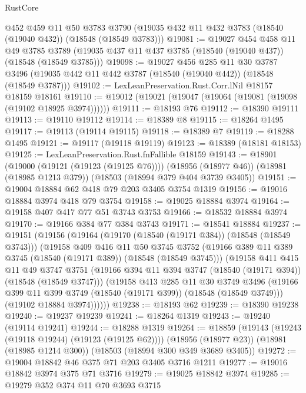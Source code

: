 \begin{lexlean}{RustCore}
\begin{coremodule}
    @452
    @459
    @11
    @50
    @3783
    @3790
    (@19035 @432 @11 @432 @3783 (@18540 (@19040 @432)) (@18548 (@18549 @3783)))
@19081 := @19027
    @454
    @458
    @11
    @49
    @3785
    @3789
    (@19035 @437 @11 @437 @3785 (@18540 (@19040 @437)) (@18548 (@18549 @3785)))
@19098 := @19027
    @456
    @285
    @11
    @30
    @3787
    @3496
    (@19035 @442 @11 @442 @3787 (@18540 (@19040 @442)) (@18548 (@18549 @3787)))
@19102 := LexLeanPreservation.Rust.Corr.lNil @18157 @18159 @18161
@19110 := @19012 (@19021 (@19047 (@19064 (@19081 (@19098 (@19102 @18925 @3974))))))
@19111 := @18193 @76
@19112 := @18390 @19111
@19113 := @19110 @19112
@19114 := @18389 @8
@19115 := @18264 @1495
@19117 := @19113 (@19114 @19115)
@19118 := @18389 @7
@19119 := @18288 @1495
@19121 := @19117 (@19118 @19119)
@19123 := @18389 (@18181 @18153)
@19125 := LexLeanPreservation.Rust.fnFallible @18159
@19143 := @18901
    (@19000 (@19121 (@19123 (@19125 @76))))
    (@18956 (@18977 @46))
    (@18981 (@18985 @1213 @379))
    (@18503 (@18994 @379 @404 @3739 @3405))
@19151 := @19004 @18884 @62 @418 @79 @203 @3405 @3754 @1319
@19156 := @19016 @18884 @3974 @418 @79 @3754
@19158 := @19025 @18884 @3974
@19164 := @19158 @407 @417 @77 @51 @3743 @3753
@19166 := @18532 @18884 @3974
@19170 := @19166 @384 @77 @384 @3743
@19171 := @18541 @18884
@19237 := @19151
    (@19156
      (@19164
        (@19170 (@18540 (@19171 @384)) (@18548 (@18549 @3743)))
        (@19158
          @409
          @416
          @11
          @50
          @3745
          @3752
          (@19166 @389 @11 @389 @3745 (@18540 (@19171 @389)) (@18548 (@18549 @3745)))
          (@19158
            @411
            @415
            @11
            @49
            @3747
            @3751
            (@19166 @394 @11 @394 @3747 (@18540 (@19171 @394)) (@18548 (@18549 @3747)))
            (@19158
              @413
              @285
              @11
              @30
              @3749
              @3496
              (@19166 @399 @11 @399 @3749 (@18540 (@19171 @399)) (@18548 (@18549 @3749)))
              (@19102 @18884 @3974))))))
@19238 := @18193 @62
@19239 := @18390 @19238
@19240 := @19237 @19239
@19241 := @18264 @1319
@19243 := @19240 (@19114 @19241)
@19244 := @18288 @1319
@19264 := @18859
    (@19143 (@19243 (@19118 @19244) (@19123 (@19125 @62))))
    (@18956 (@18977 @23))
    (@18981 (@18985 @1214 @300))
    (@18503 (@18994 @300 @349 @3689 @3405))
@19272 := @19004 @18842 @46 @375 @71 @203 @3405 @3716 @1211
@19277 := @19016 @18842 @3974 @375 @71 @3716
@19279 := @19025 @18842 @3974
@19285 := @19279 @352 @374 @11 @70 @3693 @3715

\end{coremodule}
\end{lexlean}
